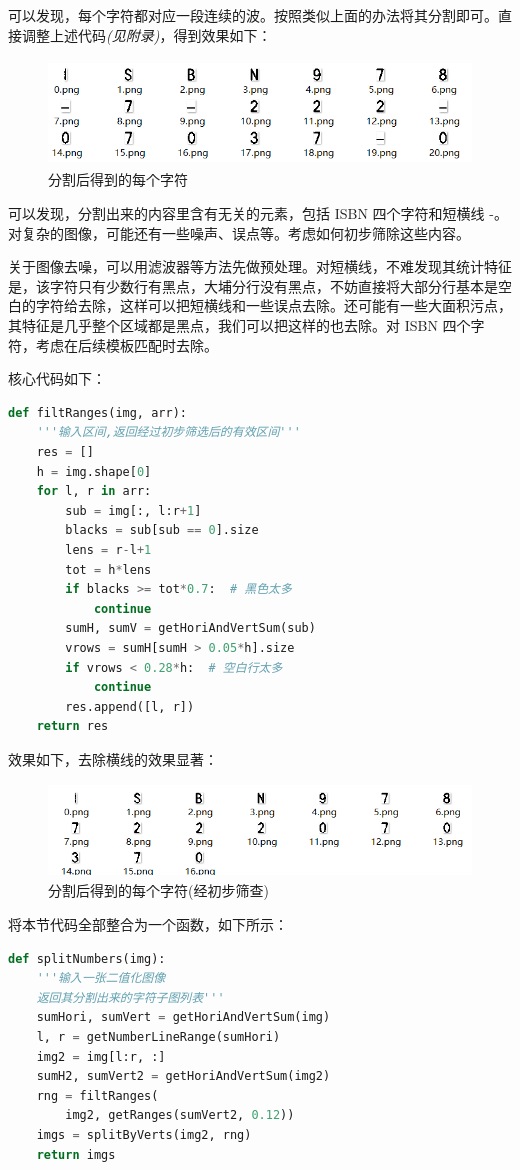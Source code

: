 \documentclass{ctexart}
\begin{document}
可以发现，每个字符都对应一段连续的波。按照类似上面的办法将其分割即可。直接调整上述代码\textit{(见附录)}，得到效果如下：
\begin{figure}[H]
    \centering
    \includegraphics[height=80pt]{sample_splitNum2}
    \caption{分割后得到的每个字符}
\end{figure}

可以发现，分割出来的内容里含有无关的元素，包括 ISBN 四个字符和短横线 -。对复杂的图像，可能还有一些噪声、误点等。考虑如何初步筛除这些内容。

关于图像去噪，可以用滤波器等方法先做预处理。对短横线，不难发现其统计特征是，该字符只有少数行有黑点，大埔分行没有黑点，不妨直接将大部分行基本是空白的字符给去除，这样可以把短横线和一些误点去除。还可能有一些大面积污点，其特征是几乎整个区域都是黑点，我们可以把这样的也去除。对 ISBN 四个字符，考虑在后续模板匹配时去除。

核心代码如下：
\begin{lstlisting}[language=python]
def filtRanges(img, arr):
    '''输入区间,返回经过初步筛选后的有效区间'''
    res = []
    h = img.shape[0]
    for l, r in arr:
        sub = img[:, l:r+1]
        blacks = sub[sub == 0].size
        lens = r-l+1
        tot = h*lens
        if blacks >= tot*0.7:  # 黑色太多
            continue
        sumH, sumV = getHoriAndVertSum(sub)
        vrows = sumH[sumH > 0.05*h].size
        if vrows < 0.28*h:  # 空白行太多
            continue
        res.append([l, r])
    return res
\end{lstlisting}

效果如下，去除横线的效果显著：
\begin{figure}[H]
    \centering
    \includegraphics[height=70pt]{sample_splitNum_flit2}
    \caption{分割后得到的每个字符(经初步筛查)}
\end{figure}

将本节代码全部整合为一个函数，如下所示：
\begin{lstlisting}[language=python]
def splitNumbers(img):
    '''输入一张二值化图像
    返回其分割出来的字符子图列表'''
    sumHori, sumVert = getHoriAndVertSum(img)
    l, r = getNumberLineRange(sumHori)
    img2 = img[l:r, :]
    sumH2, sumVert2 = getHoriAndVertSum(img2)
    rng = filtRanges(
        img2, getRanges(sumVert2, 0.12))
    imgs = splitByVerts(img2, rng)
    return imgs
\end{lstlisting}
\end{document}
